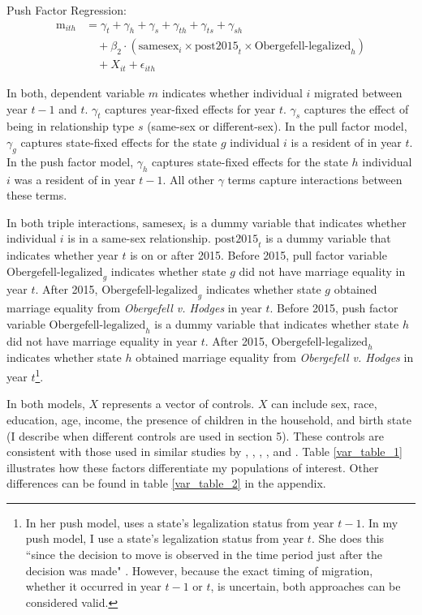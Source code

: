 \documentclass[12pt,letterpaper]{article}
\begin{document}
\hfill
\break
Push Factor Regression:
\begin{equation}
\begin{aligned}
\text{m}_{ith} &= \gamma_t + \gamma_h + \gamma_s + \gamma_{th} + \gamma_{ts} + \gamma_{sh} \\
&\quad + \beta_2 \cdot (\text{samesex}_i \times \text{post2015}_t \times \text{Obergefell-legalized}_h) \\
&\quad + X_{it} + \epsilon_{ith}
\end{aligned}
\end{equation}

In both, dependent variable $m$ indicates whether individual $i$ migrated between year $t-1$ and $t$. $\gamma_t$ captures year-fixed effects for year $t$. $\gamma_s$ captures the effect of being in relationship type $s$ (same-sex or different-sex). In the pull factor model, $\gamma_g$ captures state-fixed effects for the state $g$ individual $i$ is a resident of in year $t$. In the push factor model, $\gamma_h$ captures state-fixed effects for the state $h$ individual $i$ was a resident of in year $t-1$. All other $\gamma$ terms capture interactions between these terms. 

In both triple interactions, $\text{samesex}_i$ is a dummy variable that indicates whether individual $i$ is in a same-sex relationship. $\text{post2015}_t$ is a dummy variable that indicates whether year $t$ is on or after 2015. Before 2015, pull factor variable $\text{Obergefell-legalized}_g$ indicates whether state $g$ did not have marriage equality in year $t$. After 2015, $\text{Obergefell-legalized}_g$ indicates whether state $g$ obtained marriage equality from \textit{Obergefell v. Hodges} in year $t$. Before 2015, push factor variable $\text{Obergefell-legalized}_h$ is a dummy variable that indicates whether state $h$ did not have marriage equality in year $t$. After 2015, $\text{Obergefell-legalized}_h$ indicates whether state $h$ obtained marriage equality from \textit{Obergefell v. Hodges} in year $t$\footnote{In her push model, \citet{12} uses a state's legalization status from year $t-1$. In my push model, I use a state's legalization status from year $t$. She does this ``since the decision to move is observed in the time
period just after the decision was made" \citep[p. 2959]{12}. However, because the exact timing of migration, whether it occurred in year $t-1$ or $t$, is uncertain, both approaches can be considered valid.}.

In both models, $X$ represents a vector of controls. $X$ can include sex, race, education, age, income, the presence of children in the household, and birth state (I describe when different controls are used in section 5). These controls are consistent with those used in similar studies by \citet{1}, \citet{3}, \citet{5}, \citet{7}, and \citet{12}. Table \ref{var_table_1} illustrates how these factors differentiate my populations of interest. Other differences can be found in table \ref{var_table_2} in the appendix.
\end{document}
